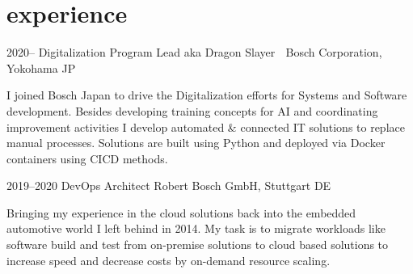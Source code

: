 \documentclass[]{friggeri-cv} %
\begin{document}

\section{\color{orange}experience}


\begin{entrylist}
\entry
{2020--}
{Digitalization Program Lead aka Dragon Slayer 🐉}
{Bosch Corporation, Yokohama JP}
{I joined Bosch Japan to drive the Digitalization efforts for Systems and Software development. Besides developing training concepts for AI and coordinating improvement activities I develop automated \& connected IT solutions to replace manual processes. Solutions are built using Python and deployed via Docker containers using CICD methods.

}
\end{entrylist}

\begin{entrylist}
\entry
{2019--2020}
{DevOps Architect}
{Robert Bosch GmbH, Stuttgart DE}
{Bringing my experience in the cloud solutions back into the embedded automotive world I left behind in 2014. My task is to migrate workloads like software build and test from on-premise solutions to cloud based solutions to increase speed and decrease costs by on-demand resource scaling.

}
\end{entrylist}


\end{document}
